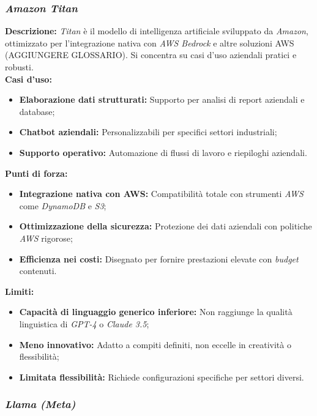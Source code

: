 \subsubsection{\textit{Amazon Titan}}

\noindent \textbf{Descrizione:}
\textit{Titan} è il modello di intelligenza artificiale sviluppato da \textit{Amazon}, ottimizzato per l’integrazione nativa con \textit{AWS Bedrock} e altre soluzioni AWS (AGGIUNGERE GLOSSARIO).
Si concentra su casi d’uso aziendali pratici e robusti.\\

\noindent \textbf{Casi d’uso:}
\begin{itemize}
    \item \textbf{Elaborazione dati strutturati:} Supporto per analisi di report aziendali e database;
    \item \textbf{Chatbot aziendali:} Personalizzabili per specifici settori industriali;
    \item \textbf{Supporto operativo:} Automazione di flussi di lavoro e riepiloghi aziendali.
\end{itemize}

\noindent \textbf{Punti di forza:}
\begin{itemize}
    \item \textbf{Integrazione nativa con AWS:} Compatibilità totale con strumenti \textit{AWS} come \textit{DynamoDB} e \textit{S3};
    \item \textbf{Ottimizzazione della sicurezza:} Protezione dei dati aziendali con politiche \textit{AWS} rigorose;
    \item \textbf{Efficienza nei costi:} Disegnato per fornire prestazioni elevate con \textit{budget} contenuti.
\end{itemize}

\noindent \textbf{Limiti:}
\begin{itemize}
    \item \textbf{Capacità di linguaggio generico inferiore:} Non raggiunge la qualità linguistica di \textit{GPT-4} o \textit{Claude 3.5};
    \item \textbf{Meno innovativo:} Adatto a compiti definiti, non eccelle in creatività o flessibilità;
    \item \textbf{Limitata flessibilità:} Richiede configurazioni specifiche per settori diversi.
\end{itemize}

\subsubsection{\textit{Llama (Meta)}}

